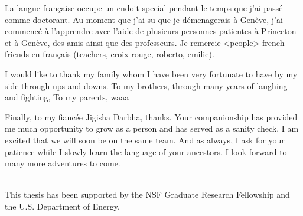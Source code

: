La langue française occupe un endoit special pendant le temps que j'ai passé comme doctorant.
Au moment que j'ai su que je démenagerais à Genève, j'ai commencé à l'apprendre avec l'aide de
plusieurs personnes patientes à Princeton et à Genève, des amis ainsi que des professeurs.
Je remercie <people> french friends en français (teachers, croix rouge, roberto, emilie).

I would like to thank my family whom I have been very fortunate to have by my side through ups and
downs. To my brothers, through many years of laughing and fighting, 
To my parents, waaa

Finally, to my fiancée Jigisha Darbha, thanks. Your companionship has provided me much opportunity
to grow as a person and has served as a sanity check.
I am excited that we will soon be on the same team. And as always, I ask for your patience
while I slowly learn the language of your ancestors. I look forward to many more adventures
to come.

\\
This thesis has been supported by the NSF Graduate Research Fellowship
and the U.S. Department of Energy.



